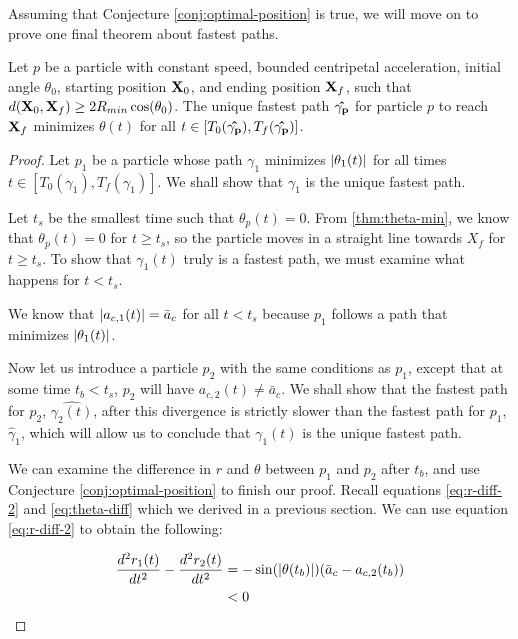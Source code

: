 Assuming that Conjecture \ref{conj:optimal-position} is true, we will move on to prove one final theorem about fastest paths.

\begin{theorem}
  Let  $p$ be a particle with constant speed, bounded centripetal acceleration, initial angle $\theta_0$, starting position $\mathbf{X}_0$, and ending position $\mathbf{X}_f$, such that $d(\bvec{X}_0, \bvec{X}_f) \ge 2 R_{min} \cos\paren{\theta_0}$. The unique fastest path $\mathbf{\hat{\gamma_p}}$ for particle $p$ to reach $\mathbf{X}_f$ minimizes $\theta(t)$ for all $t \in [T_0(\mathbf{\hat{\gamma_p}}), T_f(\mathbf{\hat{\gamma_p}})]$.
  \label{thm:restricted-theta}
\end{theorem}
\begin{proof}
Let $p_1$ be a particle whose path $\gamma_1$ minimizes $\abs{\theta_1(t)}$ for all times $t \in [T_0(\gamma_1), T_f(\gamma_1)]$. We shall show that $\gamma_1$ is the unique fastest path.

Let $t_s$ be the smallest time such that $\theta_p(t) = 0$. From \ref{thm:theta-min}, we know that $\theta_p(t) = 0$ for $t \ge t_s$, so the particle moves in a straight line towards $X_f$ for $t \ge t_s$. To show that $\gamma_1(t)$ truly is a fastest path, we must examine what happens for $t < t_s$.

We know that $\abs{a_{c,1}(t)} = \bar{a}_c$ for all $t < t_s$ because $p_1$ follows a path that minimizes $\abs{\theta_1(t)}$.

Now let us introduce a particle $p_2$ with the same conditions as $p_1$, except that at some time $t_b < t_s$, $p_2$ will have $a_{c,2}(t) \neq \bar{a}_c$. We shall show that the fastest path for $p_2$, $\hat{\gamma_2(t)}$, after this divergence is strictly slower than the fastest path for $p_1$, $\hat{\gamma}_1$, which will allow us to conclude that $\gamma_1(t)$ is the unique fastest path.

We can examine the difference in $r$ and $\theta$ between $p_1$ and $p_2$ after $t_b$, and use Conjecture \ref{conj:optimal-position} to finish our proof. Recall equations \ref{eq:r-diff-2} and \ref{eq:theta-diff} which we derived in a previous section. We can use equation \ref{eq:r-diff-2} to obtain the following:

\begin{align*}
  \frac{d^2 r_1(t)}{d t^2} - \frac{d^2 r_2(t)}{d t^2}& = - \sin\paren{\abs{\theta(t_b)}} \paren{\bar{a}_c - a_{c,2}(t_b)}\\
  & < 0
\end{align*}


\end{proof}
